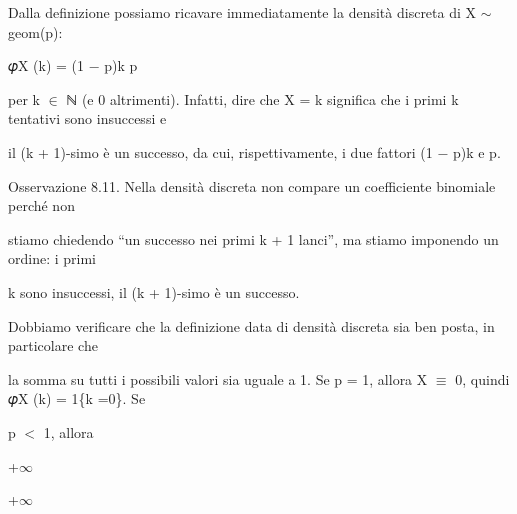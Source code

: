\documentclass[a4paper,portrait,12pt]{article}
\begin{document}
\begin{flushleft}
Dalla definizione possiamo ricavare immediatamente la densit\`{a} discreta di X $\sim$ geom(p):
\end{flushleft}


\begin{flushleft}
𝜑X (k) = (1 $-$ p)k p
\end{flushleft}


\begin{flushleft}
per k $\in$ ℕ (e 0 altrimenti). Infatti, dire che X = k significa che i primi k tentativi sono insuccessi e
\end{flushleft}


\begin{flushleft}
il (k + 1)-simo \`{e} un successo, da cui, rispettivamente, i due fattori (1 $-$ p)k e p.
\end{flushleft}


\begin{flushleft}
Osservazione 8.11. Nella densit\`{a} discreta non compare un coefficiente binomiale perch\'{e} non
\end{flushleft}


\begin{flushleft}
stiamo chiedendo {``}un successo nei primi k + 1 lanci'', ma stiamo imponendo un ordine: i primi
\end{flushleft}


\begin{flushleft}
k sono insuccessi, il (k + 1)-simo \`{e} un successo.
\end{flushleft}


\begin{flushleft}
Dobbiamo verificare che la definizione data di densit\`{a} discreta sia ben posta, in particolare che
\end{flushleft}


\begin{flushleft}
la somma su tutti i possibili valori sia uguale a 1. Se p = 1, allora X $\equiv$ 0, quindi 𝜑X (k) = 1\{k =0\}. Se
\end{flushleft}


\begin{flushleft}
p $<$ 1, allora
\end{flushleft}


+$\infty$





+$\infty$
\end{document}
